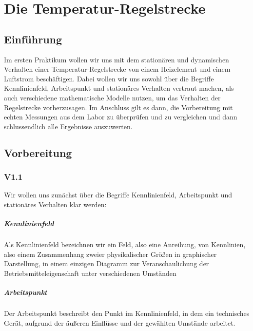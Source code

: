 \documentclass{report}
\begin{document}
\newpage


\tableofcontents

\listoffigures

\newpage

\chapter{Die Temperatur-Regelstrecke}

\section{Einführung}

Im ersten Praktikum wollen wir uns mit dem stationären und dynamischen Verhalten einer Temperatur-Regelstrecke von einem Heizelement und einem Luftstrom beschäftigen. Dabei wollen wir uns sowohl über die Begriffe Kennlinienfeld, Arbeitspunkt und stationäres Verhalten vertraut machen, als auch verschiedene mathematische Modelle nutzen, um das Verhalten der Regelstrecke vorherzusagen. Im Anschluss gilt es dann, die Vorbereitung mit echten Messungen aus dem Labor zu überprüfen und zu vergleichen und dann schlussendlich alle Ergebnisse auszuwerten.

\section{Vorbereitung}

\subsection{V1.1}

Wir wollen uns zunächst über die Begriffe Kennlinienfeld, Arbeitspunkt und stationäres Verhalten klar werden:

\paragraph{Kennlinienfeld} Als Kennlinienfeld bezeichnen wir ein Feld, also eine Anreihung, von Kennlinien, also einem Zusammenhang zweier physikalischer Größen in graphischer Darstellung,
in einem einzigen Diagramm zur Veranschaulichung der Betriebsmitteleigenschaft unter verschiedenen Umständen

\paragraph{Arbeitspunkt} Der Arbeitspunkt beschreibt den Punkt im Kennlinienfeld, in dem ein technisches Gerät, aufgrund der äußeren Einflüsse und der gewählten Umstände arbeitet.
\end{document}
